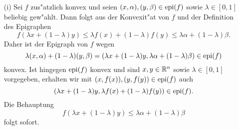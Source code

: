 \begin{itemize}
 \item[(i)] Sei $f$ zus"atzlich konvex und seien $(x,\alpha),(y,\beta)\in\operatorname{epi}(f)$ sowie $\lambda\in[0,1]$ beliebig gew"ahlt.
 Dann folgt aus der Konvexit"at von $f$ und der Definition des Epigraphen
 \begin{displaymath}
  f(\lambda x+(1-\lambda)y)\leq \lambda f(x)+(1-\lambda)f(y)\leq \lambda\alpha+(1-\lambda)\beta.
 \end{displaymath}
 Daher ist der Epigraph von $f$ wegen
 \[
\lambda(x,\alpha)+(1-\lambda)(y,\beta)=
(\lambda x+(1-\lambda)y,\lambda\alpha+(1-\lambda)\beta)\in\operatorname{epi}(f)
 \]
 konvex.
 Ist hingegen $\operatorname{epi}(f)$ konvex und sind $x,y\in\mathbb{R}^n$ sowie $\lambda\in[0,1]$ vorgegeben, erhalten wir mit
 $(x,f(x)),(y,f(y))\in\operatorname{epi}(f)$ auch
\[
 (\lambda x+(1-\lambda)y,\lambda f(x)+(1-\lambda)f(y))\in \operatorname{epi}(f).
 \]
 Die Behauptung
 \begin{displaymath}
  f(\lambda x+(1-\lambda)y)\leq\lambda\alpha+(1-\lambda)\beta
 \end{displaymath}
 folgt sofort.


\end{itemize}
